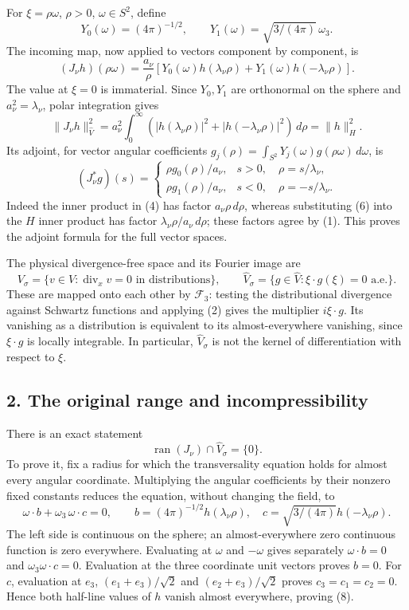 For \(\xi=\rho\omega\), \(\rho>0\), \(\omega\in S^2\), define \[
Y_0(\omega)=(4\pi)^{-1/2},\qquad
Y_1(\omega)=\sqrt{3/(4\pi)}\,\omega_3.
\tag{3}
\] The incoming map, now applied to vectors component by component, is \[
(J_\nu h)(\rho\omega)=\frac{a_\nu}{\rho}
\left[Y_0(\omega)h(\lambda_\nu\rho)
      +Y_1(\omega)h(-\lambda_\nu\rho)\right].
\tag{4}
\] The value at \(\xi=0\) is immaterial. Since \(Y_0,Y_1\) are orthonormal on the sphere and \(a_\nu^2=\lambda_\nu\), polar integration gives \[
\|J_\nu h\|_{\widehat V}^2
=a_\nu^2\int_0^\infty
 (|h(\lambda_\nu\rho)|^2+|h(-\lambda_\nu\rho)|^2)\,d\rho
=\|h\|_H^2.
\tag{5}
\] Its adjoint, for vector angular coefficients \(g_j(\rho)=\int_{S^2}Y_j(\omega)g(\rho\omega)\,d\omega\), is \[
(J_\nu^*g)(s)=
\begin{cases}
\rho g_0(\rho)/a_\nu,&s>0,\quad\rho=s/\lambda_\nu,\\
\rho g_1(\rho)/a_\nu,&s<0,\quad\rho=-s/\lambda_\nu.
\end{cases}
\tag{6}
\] Indeed the inner product in (4) has factor \(a_\nu\rho\,d\rho\), whereas substituting (6) into the \(H\) inner product has factor \(\lambda_\nu\rho/a_\nu\,d\rho\); these factors agree by (1). This proves the adjoint formula for the full vector spaces.

The physical divergence-free space and its Fourier image are \[
V_\sigma=\{v\in V:\operatorname{div}_xv=0\text{ in distributions}\},
\qquad
\widehat V_\sigma=\{g\in\widehat V:\xi\cdot g(\xi)=0\text{ a.e.}\}.
\tag{7}
\] These are mapped onto each other by \(\mathcal F_3\): testing the distributional divergence against Schwartz functions and applying (2) gives the multiplier \(i\xi\cdot g\). Its vanishing as a distribution is equivalent to its almost-everywhere vanishing, since \(\xi\cdot g\) is locally integrable. In particular, \(\widehat V_\sigma\) is not the kernel of differentiation with respect to \(\xi\).

\subsection*{2. The original range and incompressibility}

There is an exact statement \[
\operatorname{ran}(J_\nu)\cap\widehat V_\sigma=\{0\}.
\tag{8}
\] To prove it, fix a radius for which the transversality equation holds for almost every angular coordinate. Multiplying the angular coefficients by their nonzero fixed constants reduces the equation, without changing the field, to \[
\omega\cdot b+\omega_3\,\omega\cdot c=0,
\qquad
b=(4\pi)^{-1/2}h(\lambda_\nu\rho),\quad
c=\sqrt{3/(4\pi)}h(-\lambda_\nu\rho).
\tag{9}
\] The left side is continuous on the sphere; an almost-everywhere zero continuous function is zero everywhere. Evaluating at \(\omega\) and \(-\omega\) gives separately \(\omega\cdot b=0\) and \(\omega_3\omega\cdot c=0\). Evaluation at the three coordinate unit vectors proves \(b=0\). For \(c\), evaluation at \(e_3\), \((e_1+e_3)/\sqrt2\) and \((e_2+e_3)/\sqrt2\) proves \(c_3=c_1=c_2=0\). Hence both half-line values of \(h\) vanish almost everywhere, proving (8).

